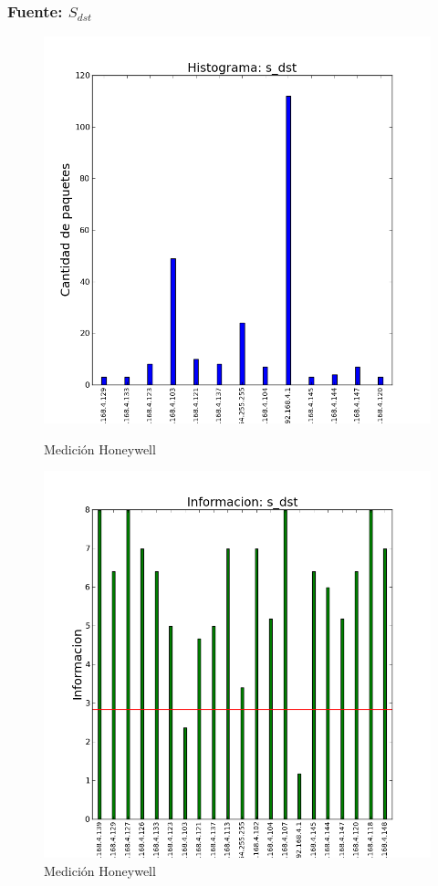 \documentclass[10pt, a4paper]{article}
\begin{document}
\subsubsection{Fuente: $S_{dst}$}

\begin{figure}[H]
   \begin{minipage}{0.5\linewidth}
     \includegraphics[width=\linewidth]{../imgs/prueba_laburo-ips_s_dst_hist.png}
     \caption{Medición Honeywell}\label{fig:Honeywell-dst-hist}
   \end{minipage}
  \hfill
   \begin{minipage}{0.5\linewidth}
     \includegraphics[width=\linewidth]{../imgs/prueba_laburo-ips_s_dst_info.png}
     \caption{Medición Honeywell}\label{fig:Honeywell-dst-info}
   \end{minipage}
 \end{figure}
\end{document}
